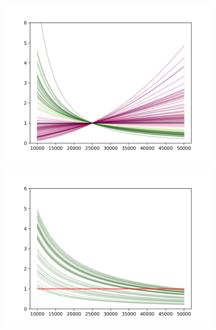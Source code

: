 \begin{figure}[htbp]
    \centering
    \begin{minipage}{0.5\textwidth}
        \centering
        \includegraphics[width=\linewidth]{results/exponent.png} %
        \label{fig:coef}
    \end{minipage}%
    \hfill
    \begin{minipage}{0.5\textwidth}
        \centering
        \includegraphics[width=\linewidth]{results/norm_constant.png} %
        \label{fig:cons}
    \end{minipage}%

\end{figure}
